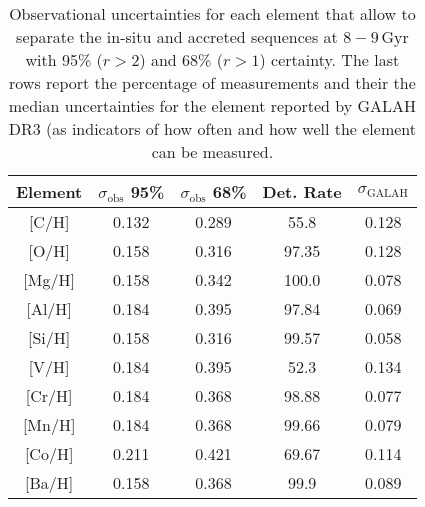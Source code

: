 \begin{table}
    \centering
    \caption{Observational uncertainties for each element that allow to separate the in-situ and accreted sequences at $8-9\,\mathrm{Gyr}$ with 95\% ($r>2$) and 68\% ($r>1$) certainty. The last rows report the percentage of measurements and their the median uncertainties for the element reported by GALAH DR3 (as indicators of how often and how well the element can be measured.}
    \begin{tabular}{ccccc}
    \hline
    Element & $\sigma_\text{obs}$ 95\% & $\sigma_\text{obs}$ 68\% & Det. Rate & $\sigma_\text{GALAH}$ \\
    \hline \hline
    {[C/H]}  & 0.132 & 0.289 & 55.8 & 0.128 \\
    {[O/H]}  & 0.158 & 0.316 & 97.35 & 0.128 \\
    {[Mg/H]}  & 0.158 & 0.342 & 100.0 & 0.078 \\
    {[Al/H]}  & 0.184 & 0.395 & 97.84 & 0.069 \\
    {[Si/H]}  & 0.158 & 0.316 & 99.57 & 0.058 \\
    {[V/H]}  & 0.184 & 0.395 & 52.3 & 0.134 \\
    {[Cr/H]}  & 0.184 & 0.368 & 98.88 & 0.077 \\
    {[Mn/H]}  & 0.184 & 0.368 & 99.66 & 0.079 \\
    {[Co/H]}  & 0.211 & 0.421 & 69.67 & 0.114 \\
    {[Ba/H]}  & 0.158 & 0.368 & 99.9 & 0.089 \\
    \hline
    \end{tabular}
    \label{tab:uncertainties}
\end{table}

